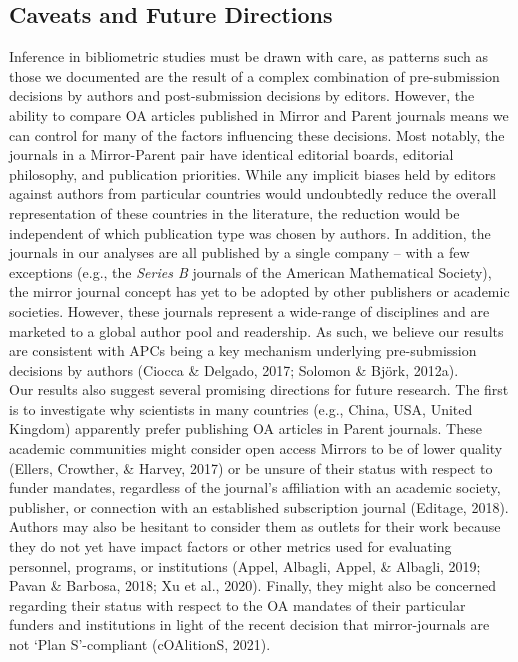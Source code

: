 \documentclass[
  english,
  man]{apa6}
\begin{document}
\hypertarget{caveats-and-future-directions}{%
\subsection{Caveats and Future Directions}\label{caveats-and-future-directions}}

Inference in bibliometric studies must be drawn with care, as patterns such as those we documented are the result of a complex combination of pre-submission decisions by authors and post-submission decisions by editors. However, the ability to compare OA articles published in Mirror and Parent journals means we can control for many of the factors influencing these decisions. Most notably, the journals in a Mirror-Parent pair have identical editorial boards, editorial philosophy, and publication priorities. While any implicit biases held by editors against authors from particular countries would undoubtedly reduce the overall representation of these countries in the literature, the reduction would be independent of which publication type was chosen by authors. In addition, the journals in our analyses are all published by a single company -- with a few exceptions (e.g., the \emph{Series B} journals of the American Mathematical Society), the mirror journal concept has yet to be adopted by other publishers or academic societies. However, these journals represent a wide-range of disciplines and are marketed to a global author pool and readership. As such, we believe our results are consistent with APCs being a key mechanism underlying pre-submission decisions by authors (Ciocca \& Delgado, 2017; Solomon \& Björk, 2012a).\\
Our results also suggest several promising directions for future research. The first is to investigate why scientists in many countries (e.g., China, USA, United Kingdom) apparently prefer publishing OA articles in Parent journals. These academic communities might consider open access Mirrors to be of lower quality (Ellers, Crowther, \& Harvey, 2017) or be unsure of their status with respect to funder mandates, regardless of the journal's affiliation with an academic society, publisher, or connection with an established subscription journal (Editage, 2018). Authors may also be hesitant to consider them as outlets for their work because they do not yet have impact factors or other metrics used for evaluating personnel, programs, or institutions (Appel, Albagli, Appel, \& Albagli, 2019; Pavan \& Barbosa, 2018; Xu et al., 2020). Finally, they might also be concerned regarding their status with respect to the OA mandates of their particular funders and institutions in light of the recent decision that mirror-journals are not `Plan S'-compliant (cOAlitionS, 2021).\\
\end{document}
